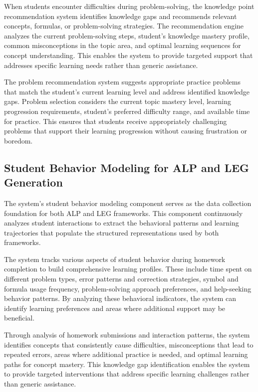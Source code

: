 \documentclass[conference]{IEEEtran}
\begin{document}
\begin{IEEEkeywords}
When students encounter difficulties during problem-solving, the knowledge point recommendation system identifies knowledge gaps and recommends relevant concepts, formulas, or problem-solving strategies. The recommendation engine analyzes the current problem-solving steps, student's knowledge mastery profile, common misconceptions in the topic area, and optimal learning sequences for concept understanding. This enables the system to provide targeted support that addresses specific learning needs rather than generic assistance.

The problem recommendation system suggests appropriate practice problems that match the student's current learning level and address identified knowledge gaps. Problem selection considers the current topic mastery level, learning progression requirements, student's preferred difficulty range, and available time for practice. This ensures that students receive appropriately challenging problems that support their learning progression without causing frustration or boredom.

\subsection{Student Behavior Modeling for ALP and LEG Generation}

The system's student behavior modeling component serves as the data collection foundation for both ALP and LEG frameworks. This component continuously analyzes student interactions to extract the behavioral patterns and learning trajectories that populate the structured representations used by both frameworks.

The system tracks various aspects of student behavior during homework completion to build comprehensive learning profiles. These include time spent on different problem types, error patterns and correction strategies, symbol and formula usage frequency, problem-solving approach preferences, and help-seeking behavior patterns. By analyzing these behavioral indicators, the system can identify learning preferences and areas where additional support may be beneficial.

Through analysis of homework submissions and interaction patterns, the system identifies concepts that consistently cause difficulties, misconceptions that lead to repeated errors, areas where additional practice is needed, and optimal learning paths for concept mastery. This knowledge gap identification enables the system to provide targeted interventions that address specific learning challenges rather than generic assistance.


\end{IEEEkeywords}
\end{document}
